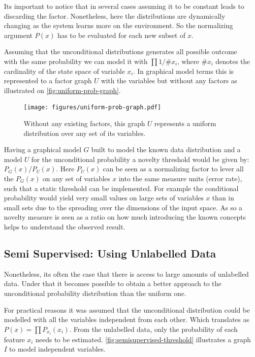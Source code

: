 \documentclass[runningheads,a4paper]{llncs}
\begin{document}
Its important to notice that in several cases assuming it to be constant leads to
discarding the factor.
Nonetheless, here the distributions are dynamically changing as the system learns
more on the environment.
So the normalizing argument $P(x)$ has to be evaluated for each new subset of $x$.

Assuming that the unconditional distributions generates all possible outcome with
the same probability we can model it with $\prod{1/\# x_i}$,
where $\# x_i$ denotes the cardinality of the state space of variable $x_i$.
In graphical model terms this is represented to a factor graph $U$ with the
variables but without any factors as illustrated on \autoref{fig:uniform-prob-graph}.

\begin{figure}
\centering
\texttt{[image: figures/uniform-prob-graph.pdf]}
\caption{\label{fig:uniform-prob-graph}Without any existing factors, this graph $U$ represents a
         uniform distribution over any set of its variables.}
\end{figure}

Having a graphical model $G$ built to model the known data distribution and a model
$U$ for the unconditional probability a novelty threshold would be given by:
$P_G(x)/P_U(x)$.
Here $P_{U}(x)$ can be seen as a normalizing factor to lever all the $P_G(x)$ on any set of
variables $x$ into the same measure units (error rate), such that a static threshold can be implemented.
For example the conditional probability would yield very small values on large sets of variables
$x$ than in small sets due to the spreading over the dimensions of the input space.
As so a novelty measure is seen as a ratio on how much introducing the known concepts helps to
understand the observed result.


\subsection{Semi Supervised: Using Unlabelled Data}
Nonetheless, its often the case that there is access to large amounts of unlabelled data.
Under that it becomes possible to obtain a better approach to the unconditional probability
distribution than the uniform one.

For practical reasons it was assumed that the unconditional distribution
could be modelled with all the variables independent from each other.
Which translates as $P(x)=\prod{P_{x_i}(x_i)}$.
From the unlabelled data, only the probability of each feature $x_i$ needs to be estimated.
\autoref{fig:semisupervised-threshold} illustrates a graph $I$ to model independent variables.
\end{document}
